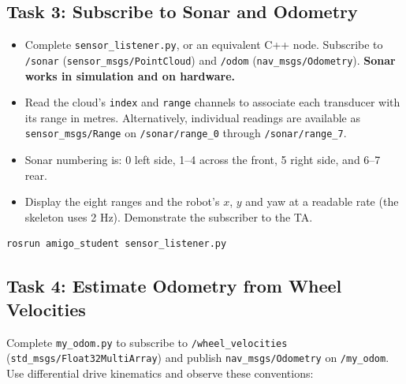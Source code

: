 \documentclass[12pt]{article}
\begin{document}
\subsection*{Task 3: Subscribe to Sonar and Odometry}

\begin{itemize}
  \item Complete \texttt{sensor\_listener.py}, or an equivalent C++ node. Subscribe to \texttt{/sonar} (\texttt{sensor\_msgs/PointCloud}) and \texttt{/odom} (\texttt{nav\_msgs/Odometry}). \textbf{Sonar works in simulation and on hardware.}
  \item Read the cloud's \texttt{index} and \texttt{range} channels to associate each transducer with its range in metres. Alternatively, individual readings are available as \texttt{sensor\_msgs/Range} on \texttt{/sonar/range\_0} through \texttt{/sonar/range\_7}.
  \item Sonar numbering is: 0 left side, 1--4 across the front, 5 right side, and 6--7 rear.
  \item Display the eight ranges and the robot's $x$, $y$ and yaw at a readable rate (the skeleton uses 2 Hz). Demonstrate the subscriber to the TA.
\end{itemize}

\begin{tcolorbox}
\begin{lstlisting}[language=bash]
rosrun amigo_student sensor_listener.py
\end{lstlisting}
\end{tcolorbox}

\newpage
\subsection*{Task 4: Estimate Odometry from Wheel Velocities}

Complete \texttt{my\_odom.py} to subscribe to
\texttt{/wheel\_velocities} (\texttt{std\_msgs/Float32MultiArray}) and
publish \texttt{nav\_msgs/Odometry} on \texttt{/my\_odom}.
Use differential drive kinematics and observe these conventions:
\end{document}
